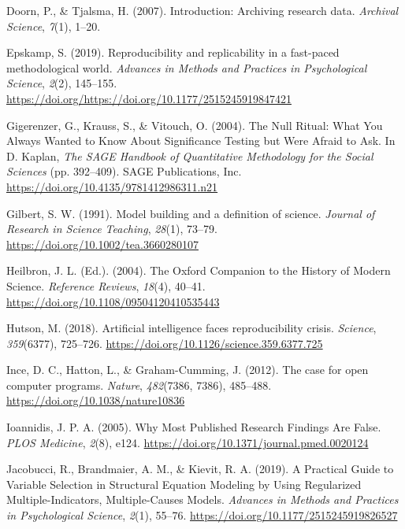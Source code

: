 \documentclass[12pt,a4paper,twoside]{article}
\begin{document}
\leavevmode\hypertarget{ref-doornIntroductionArchivingResearch2007}{}%
Doorn, P., \& Tjalsma, H. (2007). Introduction: Archiving research data. \emph{Archival Science}, \emph{7}(1), 1--20.

\leavevmode\hypertarget{ref-epskamp2019rep}{}%
Epskamp, S. (2019). Reproducibility and replicability in a fast-paced methodological world. \emph{Advances in Methods and Practices in Psychological Science}, \emph{2}(2), 145--155. \url{https://doi.org/https://doi.org/10.1177/2515245919847421}

\leavevmode\hypertarget{ref-gigerenzerNullRitualWhat2004}{}%
Gigerenzer, G., Krauss, S., \& Vitouch, O. (2004). The Null Ritual: What You Always Wanted to Know About Significance Testing but Were Afraid to Ask. In D. Kaplan, \emph{The SAGE Handbook of Quantitative Methodology for the Social Sciences} (pp. 392--409). SAGE Publications, Inc. \url{https://doi.org/10.4135/9781412986311.n21}

\leavevmode\hypertarget{ref-gilbertModelBuildingDefinition1991}{}%
Gilbert, S. W. (1991). Model building and a definition of science. \emph{Journal of Research in Science Teaching}, \emph{28}(1), 73--79. \url{https://doi.org/10.1002/tea.3660280107}

\leavevmode\hypertarget{ref-heilbronOxfordCompanionHistory2004}{}%
Heilbron, J. L. (Ed.). (2004). The Oxford Companion to the History of Modern Science. \emph{Reference Reviews}, \emph{18}(4), 40--41. \url{https://doi.org/10.1108/09504120410535443}

\leavevmode\hypertarget{ref-hutsonArtificialIntelligenceFaces2018}{}%
Hutson, M. (2018). Artificial intelligence faces reproducibility crisis. \emph{Science}, \emph{359}(6377), 725--726. \url{https://doi.org/10.1126/science.359.6377.725}

\leavevmode\hypertarget{ref-inceCaseOpenComputer2012}{}%
Ince, D. C., Hatton, L., \& Graham-Cumming, J. (2012). The case for open computer programs. \emph{Nature}, \emph{482}(7386, 7386), 485--488. \url{https://doi.org/10.1038/nature10836}

\leavevmode\hypertarget{ref-ioannidisWhyMostPublished2005}{}%
Ioannidis, J. P. A. (2005). Why Most Published Research Findings Are False. \emph{PLOS Medicine}, \emph{2}(8), e124. \url{https://doi.org/10.1371/journal.pmed.0020124}

\leavevmode\hypertarget{ref-jacobucciPracticalGuideVariable2019}{}%
Jacobucci, R., Brandmaier, A. M., \& Kievit, R. A. (2019). A Practical Guide to Variable Selection in Structural Equation Modeling by Using Regularized Multiple-Indicators, Multiple-Causes Models. \emph{Advances in Methods and Practices in Psychological Science}, \emph{2}(1), 55--76. \url{https://doi.org/10.1177/2515245919826527}
\end{document}
